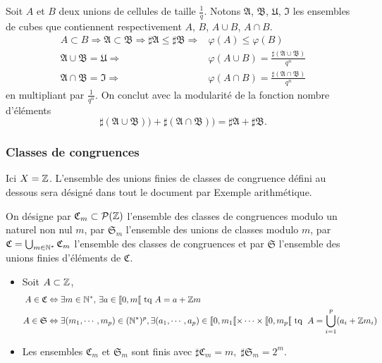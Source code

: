\begin{demo}
 Soit $A$ et $B$ deux unions de cellules de taille $\frac{1}{q}$. Notons $\mathfrak{A}$, $\mathfrak{B}$, $\mathfrak{U}$, $\mathfrak{I}$ les ensembles de cubes que contiennent respectivement $A$, $B$, $A\cup B$, $A\cap B$.
 \begin{align*}
  A \subset B \Rightarrow \mathfrak{A} \subset \mathfrak{B} \Rightarrow \sharp\mathfrak{A} \leq \sharp \mathfrak{B} \Rightarrow& \varphi(A) \leq \varphi(B) \\
  \mathfrak{A}\cup \mathfrak{B} = \mathfrak{U} \Rightarrow& \varphi(A\cup B) = \frac{\sharp(\mathfrak{A}\cup \mathfrak{B})}{q^n} \\
  \mathfrak{A}\cap \mathfrak{B} = \mathfrak{I} \Rightarrow& \varphi(A\cap B) = \frac{\sharp(\mathfrak{A}\cap \mathfrak{B})}{q^n}
 \end{align*}
 en multipliant par $\frac{1}{q^n}$. On conclut avec la modularité de la fonction nombre d'éléments
 \begin{displaymath}
  \sharp(\mathfrak{A}\cup \mathfrak{B})) + \sharp(\mathfrak{A}\cap \mathfrak{B})) = \sharp\mathfrak{A} + \sharp \mathfrak{B}.
 \end{displaymath}
\end{demo}

\subsubsection{Classes de congruences}
Ici $X = \mathbb{Z}$. 
L'ensemble des unions finies de classes de congruence défini au dessous sera désigné dans tout le document par \og Exemple arithmétique\fg.

\begin{defi}
On désigne par $\mathfrak{C}_m \subset \mathcal{P}(\mathbb{Z})$ l'ensemble des classes de congruences modulo un naturel non nul $m$, par $\mathfrak{S}_m$ l'ensemble des unions de classes modulo $m$, par $\mathfrak{C} = \bigcup_{m \in \mathbb{N}^*}\mathfrak{C}_m$ l'ensemble des classes de congruences et par $\mathfrak{S}$ l'ensemble des unions finies d'éléments de $\mathfrak{C}$.
\end{defi}
\begin{rems}
 \begin{itemize}
  \item Soit $A \subset \mathbb{Z}$,
  \begin{align*}
 A \in \mathfrak{C}  &\Leftrightarrow \exists m\in \mathbb{N}^*,\, \exists a \in \llbracket 0, m \llbracket \text{ tq } A = a + \mathbb{Z} m \\
 A\in \mathfrak{S} &\Leftrightarrow \exists (m_1,\cdots,m_p) \in (\mathbb{N}^*)^p, \exists (a_1,\cdots,a_p)\in \llbracket 0,m_1\llbracket \times \dots \times \llbracket 0,m_p\llbracket \text{ tq }\;
 A = \bigcup_{i=1}^{p}(a_i + \mathbb{Z} m_i)
  \end{align*}
    \item Les ensembles $\mathfrak{C}_m$ et $\mathfrak{S}_m$ sont finis avec $\sharp \mathfrak{C}_m = m, \; \sharp \mathfrak{S}_m = 2^m$.
  \end{itemize}
\end{rems}

